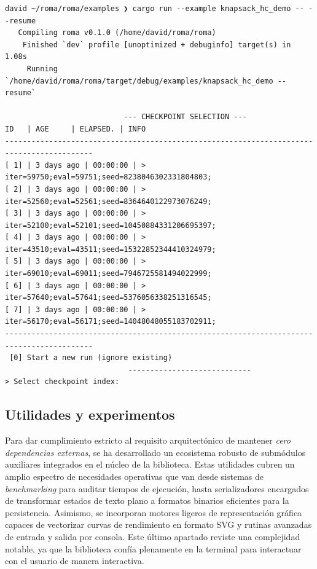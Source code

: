 \documentclass[12pt,a4paper,twoside,openright]{book}
\begin{document}
        \begin{listing}[H]
        \begin{verbatim}
david ~/roma/roma/examples ❯ cargo run --example knapsack_hc_demo -- --resume
   Compiling roma v0.1.0 (/home/david/roma/roma)
    Finished `dev` profile [unoptimized + debuginfo] target(s) in 1.08s
     Running `/home/david/roma/roma/target/debug/examples/knapsack_hc_demo --resume`

                           --- CHECKPOINT SELECTION ---
ID   | AGE     | ELAPSED. | INFO
------------------------------------------------------------------------------------------
[ 1] | 3 days ago | 00:00:00 | > iter=59750;eval=59751;seed=8238046302331804803;
[ 2] | 3 days ago | 00:00:00 | > iter=52560;eval=52561;seed=8364640122973076249;
[ 3] | 3 days ago | 00:00:00 | > iter=52100;eval=52101;seed=10450884331206695397;
[ 4] | 3 days ago | 00:00:00 | > iter=43510;eval=43511;seed=15322852344410324979;
[ 5] | 3 days ago | 00:00:00 | > iter=69010;eval=69011;seed=7946725581494022999;
[ 6] | 3 days ago | 00:00:00 | > iter=57640;eval=57641;seed=5376056338251316545;
[ 7] | 3 days ago | 00:00:00 | > iter=56170;eval=56171;seed=14048048055183702911;
------------------------------------------------------------------------------------------
 [0] Start a new run (ignore existing)
                            ----------------------------
> Select checkpoint index:
        \end{verbatim}
        \caption{Ejemplo solicitud de punto de control, al intentar reanudar la ejecución de un algoritmo}
        \label{lst:resume_example}
        \end{listing}

 
    \subsection{Utilidades y experimentos }
        Para dar cumplimiento estricto al requisito arquitectónico de mantener \emph{cero dependencias externas}, se ha desarrollado un ecosistema robusto de submódulos auxiliares integrados en el núcleo de la biblioteca. Estas utilidades cubren un amplio espectro de necesidades operativas que van desde sistemas de \textit{benchmarking} para auditar tiempos de ejecución, hasta serializadores encargados de transformar estados de texto plano a formatos binarios eficientes para la persistencia. Asimismo, se incorporan motores ligeros de representación gráfica capaces de vectorizar curvas de rendimiento en formato SVG y rutinas avanzadas de entrada y salida por consola. Este último apartado reviste una complejidad notable, ya que la biblioteca confía plenamente en la terminal para interactuar con el usuario de manera interactiva.
    
\end{document}

